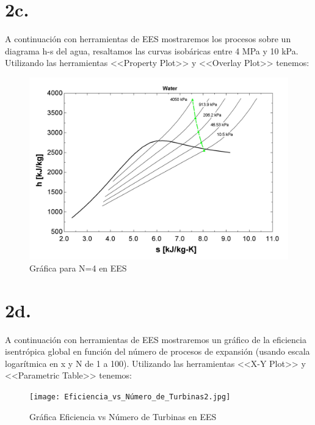 \documentclass{article}
\theoremstyle{mytheoremstyle}
\theoremstyle{mytheoremstyle}
\theoremstyle{myproblemstyle}
\begin{document}
\section*{2c.}
A continuación con herramientas de EES mostraremos los procesos sobre un diagrama h-s del agua, resaltamos las curvas isobáricas entre 4 MPa y 10 kPa. Utilizando las herramientas <<Property Plot>> y <<Overlay Plot>> tenemos:
\begin{figure}[h!] %
    \centering
    \includegraphics[width=1\textwidth]{h-s_4___TURBINAS.jpg} %
    \caption{Gráfica para N=4 en EES}
    \label{fig:mi_imagen}
\end{figure}

\section*{2d.}
A continuación con herramientas de EES mostraremos un gráfico de la eficiencia isentrópica global en función del número de procesos de expansión (usando escala logarítmica en x y N de 1 a 100). Utilizando las herramientas <<X-Y Plot>> y <<Parametric Table>> tenemos:
\begin{figure}[h!] %
    \centering
    \texttt{[image: Eficiencia\_vs\_Número\_de\_Turbinas2.jpg]} %
    \caption{Gráfica Eficiencia vs Número de Turbinas en EES}
    \label{fig:mi_imagen}
\end{figure}
\newpage

\nocite{*}

\end{document}

